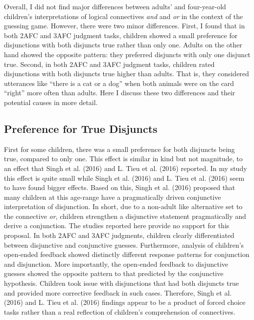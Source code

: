\documentclass[oneside]{report}
\theoremstyle{definition}
\theoremstyle{definition}
\theoremstyle{definition}
\theoremstyle{remark}
\begin{document}
Overall, I did not find major differences between adults' and
four-year-old children's interpretations of logical connectives
\emph{and} and \emph{or} in the context of the guessing game. However,
there were two minor differences. First, I found that in both 2AFC and
3AFC judgment tasks, children showed a small preference for disjunctions
with both disjuncts true rather than only one. Adults on the other hand
showed the opposite pattern: they preferred disjuncts with only one
disjunct true. Second, in both 2AFC and 3AFC judgment tasks, children
rated disjunctions with both disjuncts true higher than adults. That is,
they considered utterances like ``there is a cat or a dog'' when both
animals were on the card ``right'' more often than adults. Here I
discuss these two differences and their potential causes in more detail.

\subsection{Preference for True Disjuncts}\label{conjunctive}

First for some children, there was a small preference for both disjuncts
being true, compared to only one. This effect is similar in kind but not
magnitude, to an effect that Singh et al. (2016) and L. Tieu et al.
(2016) reported. In my study this effect is quite small while Singh et
al. (2016) and L. Tieu et al. (2016) seem to have found bigger effects.
Based on this, Singh et al. (2016) proposed that many children at this
age-range have a pragmatically driven conjunctive interpretation of
disjunction. In short, due to a non-adult like alternative set to the
connective \emph{or}, children strengthen a disjunctive statement
pragmatically and derive a conjunction. The studies reported here
provide no support for this proposal. In both 2AFC and 3AFC judgments,
children clearly differentiated between disjunctive and conjunctive
guesses. Furthermore, analysis of children's open-ended feedback showed
distinctly different response patterns for conjunction and disjunction.
More importantly, the open-ended feedback to disjunctive guesses showed
the opposite pattern to that predicted by the conjunctive hypothesis.
Children took issue with disjunctions that had both disjuncts true and
provided more corrective feedback in such cases. Therefore, Singh et al.
(2016) and L. Tieu et al. (2016) findings appear to be a product of
forced choice tasks rather than a real reflection of children's
comprehension of connectives.
\end{document}
